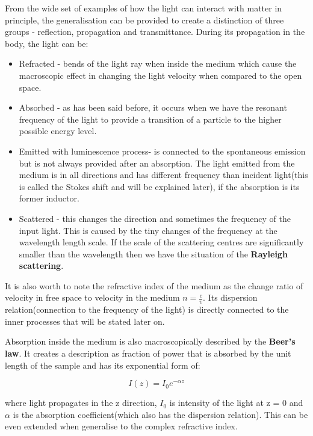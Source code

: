 From the wide set of examples of how the light can interact with matter in principle, the generalisation can be provided to create a distinction of three groups - reflection, propagation and transmittance. During its propagation in the body, the light can be:

\begin{itemize}
\item Refracted - bends of the light ray when inside the medium which cause the macroscopic effect in changing the light velocity when compared to the open space. 
\item Absorbed - as has been said before, it occurs when we have the resonant frequency of the light to provide a transition of a particle to the higher possible energy level. 
\item Emitted with luminescence process- is connected to the spontaneous emission but is not always provided after an absorption. The light emitted from the medium is in all directions and has different frequency than incident light(this is called the Stokes shift and will be explained later), if the absorption is its former inductor. 
\item Scattered - this changes the direction and sometimes the frequency of the input light. This is caused by the tiny changes of the frequency at the wavelength length scale. If the scale of the scattering centres are significantly smaller than the wavelength then we have the situation of the \textbf{Rayleigh scattering}.
\end{itemize}

It is also worth to note the refractive index of the medium as the change ratio of velocity in free space to velocity in the medium $n = \frac{c}{v}$. Its dispersion relation(connection to the frequency of the light) is directly connected to the inner processes that will be stated later on. 

Absorption inside the medium is also macroscopically described by the \textbf{Beer's law}. It creates a description as fraction of power that is absorbed by the unit length of the sample and has its exponential form of:

\begin{equation}
I(z) = I_0 e^{-\alpha z}
\end{equation}

where light propagates in the z direction, $I_0$ is intensity of the light at z = 0 and $\alpha$ is the absorption coefficient(which also has the dispersion relation). This can be even extended when generalise to the complex refractive index. 

